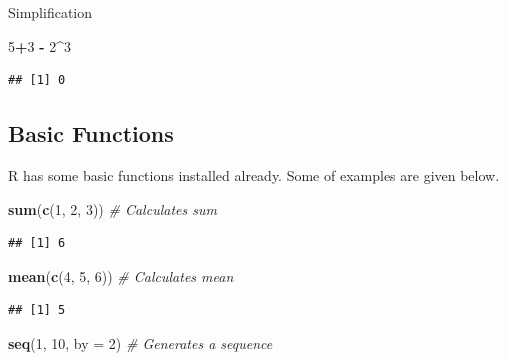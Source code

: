 \documentclass[
]{article}
\newenvironment{Shaded}{\begin{snugshade}}{\end{snugshade}}
\newcommand{\AttributeTok}[1]{\textcolor[rgb]{0.13,0.29,0.53}{#1}}
\newcommand{\CommentTok}[1]{\textcolor[rgb]{0.56,0.35,0.01}{\textit{#1}}}
\newcommand{\DecValTok}[1]{\textcolor[rgb]{0.00,0.00,0.81}{#1}}
\newcommand{\FunctionTok}[1]{\textcolor[rgb]{0.13,0.29,0.53}{\textbf{#1}}}
\newcommand{\NormalTok}[1]{#1}
\newcommand{\SpecialCharTok}[1]{\textcolor[rgb]{0.81,0.36,0.00}{\textbf{#1}}}
\begin{document}
Simplification

\begin{Shaded}
\begin{Highlighting}[]
\DecValTok{5}\SpecialCharTok{+}\DecValTok{3} \SpecialCharTok{{-}} \DecValTok{2}\SpecialCharTok{\^{}}\DecValTok{3}
\end{Highlighting}
\end{Shaded}

\begin{verbatim}
## [1] 0
\end{verbatim}

\subsection{Basic Functions}\label{basic-functions}

R has some basic functions installed already. Some of examples are given
below.

\begin{Shaded}
\begin{Highlighting}[]
\FunctionTok{sum}\NormalTok{(}\FunctionTok{c}\NormalTok{(}\DecValTok{1}\NormalTok{, }\DecValTok{2}\NormalTok{, }\DecValTok{3}\NormalTok{))            }\CommentTok{\# Calculates sum}
\end{Highlighting}
\end{Shaded}

\begin{verbatim}
## [1] 6
\end{verbatim}

\begin{Shaded}
\begin{Highlighting}[]
\FunctionTok{mean}\NormalTok{(}\FunctionTok{c}\NormalTok{(}\DecValTok{4}\NormalTok{, }\DecValTok{5}\NormalTok{, }\DecValTok{6}\NormalTok{))           }\CommentTok{\# Calculates mean}
\end{Highlighting}
\end{Shaded}

\begin{verbatim}
## [1] 5
\end{verbatim}

\begin{Shaded}
\begin{Highlighting}[]
\FunctionTok{seq}\NormalTok{(}\DecValTok{1}\NormalTok{, }\DecValTok{10}\NormalTok{, }\AttributeTok{by =} \DecValTok{2}\NormalTok{)         }\CommentTok{\# Generates a sequence}
\end{Highlighting}
\end{Shaded}
\end{document}
